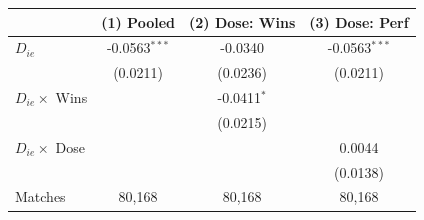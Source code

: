 \begin{tabular}{lccc}
\toprule
 & (1) Pooled & (2) Dose: Wins & (3) Dose: Perf \\
\midrule
$D_{ie}$ & -0.0563$^{***}$ & -0.0340 & -0.0563$^{***}$ \\
 & (0.0211) & (0.0236) & (0.0211) \\
$D_{ie} \times$ Wins &  & -0.0411$^{*}$ &  \\
 &  & (0.0215) &  \\
$D_{ie} \times$ Dose &  &  & 0.0044 \\
 &  &  & (0.0138) \\
\midrule
Matches & 80,168 & 80,168 & 80,168 \\
\bottomrule
\end{tabular}
